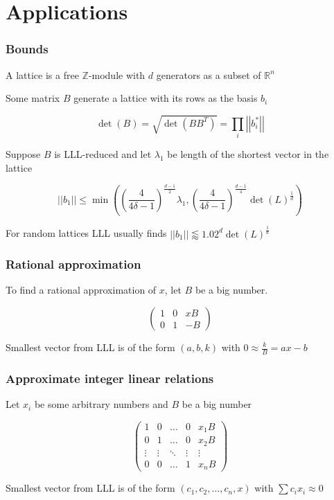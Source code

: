 \documentclass{beamer}
\newcommand{\vabs}[1]{\left|\left|#1\right|\right|}
\begin{document}
\section{Applications}

\begin{frame}
    \frametitle{Bounds}
    A lattice is a free $\mathbb Z$-module with $d$ generators as a subset of $\mathbb R^n$

    Some matrix $B$ generate a lattice with its rows as the basis $b_i$

    $$\det(B)=\sqrt{\det\left(BB^T\right)}=\prod_i\vabs{b_i^*}$$\pause

    Suppose $B$ is LLL-reduced and let $\lambda_1$ be length of the shortest vector in the lattice

    $$\vabs{b_1}\leq\min\left(\left(\frac4{4\delta-1}\right)^{\frac{d-1}2}\lambda_1,\left(\frac4{4\delta-1}\right)^{\frac{d-1}4}\det(L)^{\frac1d}\right)$$\pause

    For random lattices LLL usually finds $\vabs{b_1}\lessapprox1.02^d\det(L)^{\frac1d}$
\end{frame}

\begin{frame}
    \frametitle{Rational approximation}
    To find a rational approximation of $x$, let $B$ be a big number. 

    $$\begin{pmatrix}1&0&xB\\0&1&-B\end{pmatrix}$$

    Smallest vector from LLL is of the form $(a,b,k)$ with $0\approx\frac kB=ax-b$
\end{frame}

\begin{frame}
    \frametitle{Approximate integer linear relations}
    Let $x_i$ be some arbitrary numbers and $B$ be a big number

    $$\begin{pmatrix}1&0&\dots&0&x_1B\\0&1&\dots&0&x_2B\\\vdots&\vdots&\ddots&\vdots&\vdots\\0&0&\dots&1&x_nB\end{pmatrix}$$

    Smallest vector from LLL is of the form $\left(c_1,c_2,\dots,c_n,x\right)$ with $\sum c_ix_i\approx0$
\end{frame}
\end{document}
